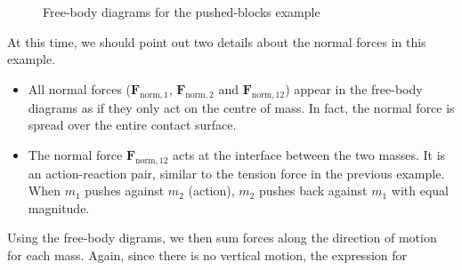 \begin{figure}[ht]
  \centering
  \begin{subfigure}{.4\textwidth}
    \centering
  \end{subfigure}
  \begin{subfigure}{.4\textwidth}
    \centering
  \end{subfigure}
  \caption{Free-body diagrams for the pushed-blocks example}
  \label{fig:fbd-pushed}
\end{figure}
\begin{remark}
  At this time, we should point out two details about the normal forces in
  this example.
  \begin{itemize}[itemsep=6pt]
  \item All normal forces ($\bm F_{\text{norm},1}$, $\bm F_{\text{norm},2}$ and
    $\bm F_{\text{norm},12}$) appear in the free-body diagrams as if they only act
    on the centre of mass. In fact, the normal force is spread over the entire
    contact surface.
  \item The normal force $\bm F_{\text{norm},12}$ acts at the interface between the
    two masses. It is an action-reaction pair, similar to the tension force in
    the previous example. When $m_1$ pushes against $m_2$ (action), $m_2$
    pushes back against $m_1$ with equal magnitude.
  \end{itemize}  
\end{remark}
Using the free-body digrams, we then sum forces along the direction of motion
for each mass. Again, since there is no vertical motion, the expression for
